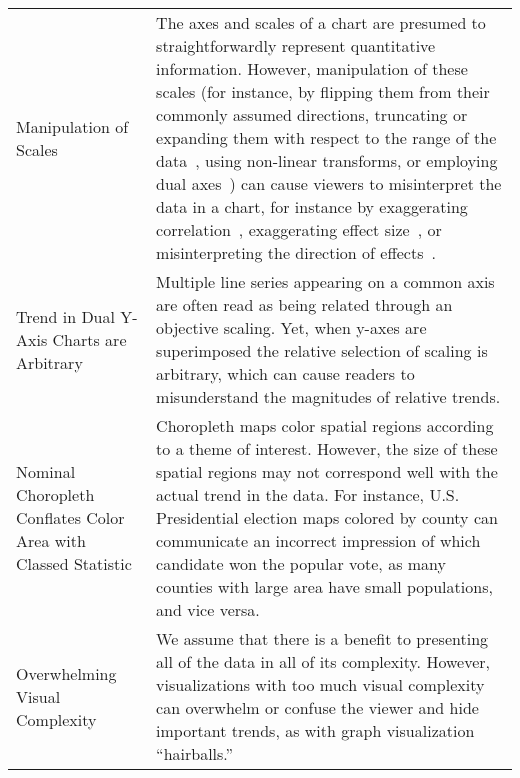 \begin{longtable}{>{\raggedright\arraybackslash}p{3cm}p{14cm}}
 \rowcolor{colorc-opaque}Manipulation of  Scales  & The axes and scales of a chart are presumed to straightforwardly represent quantitative information. However, manipulation of these scales (for instance, by flipping them from their commonly assumed directions, truncating or expanding them with respect to the range of the data~\cite{pandey2015deceptive, correll2017black, cleveland1982variables, ritchie2019lie, correll2019truncating}, using non-linear transforms, or employing dual axes~\cite{KindlmannAlgebraicVisPedagogyPDV2016, cairo2015graphics}) can cause viewers to misinterpret the data in a chart, for instance by exaggerating correlation~\cite{cleveland1982variables}, exaggerating effect size~\cite{correll2019truncating,pandey2015deceptive}, or misinterpreting the direction of effects~\cite{pandey2015deceptive}. \cite{cairo2015graphics,correll2017black,correll2019truncating,cleveland1982variables,KindlmannAlgebraicVisPedagogyPDV2016,pandey2015deceptive,ritchie2019lie}\\
 \rowcolor{colorc}Trend in Dual Y-Axis Charts are Arbitrary  & Multiple line series appearing on a common axis are often read as being related through an objective scaling. Yet, when y-axes are superimposed the relative selection of scaling is arbitrary, which can cause readers to misunderstand the magnitudes of relative trends. \cite{KindlmannAlgebraicVisPedagogyPDV2016, cairo2015graphics}\\
 \rowcolor{colorc-opaque}Nominal Choropleth Conflates Color Area with Classed Statistic  & Choropleth maps color spatial regions according to a theme of interest. However, the size of these spatial regions may not correspond well with the actual trend in the data. For instance, U.S. Presidential election maps colored by county can communicate an incorrect impression of which candidate won the popular vote, as many counties with large area have small populations, and vice versa. \cite{gastner2005maps,nusrat2016state}\\
 \rowcolor{colorc}Overwhelming Visual Complexity  & We assume that there is a benefit to presenting all of the data in all of its complexity. However, visualizations with too much visual complexity can overwhelm or confuse the viewer and hide important trends, as with graph visualization ``hairballs.'' \cite{hofmann2012graphical, greadability}\\
  


\end{longtable}
